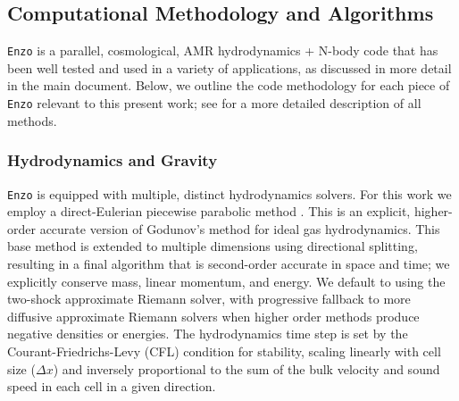 \documentclass[11pt]{article}
\begin{document}
\subsection{Computational Methodology and Algorithms}

\texttt{Enzo} is a parallel, cosmological, AMR hydrodynamics + N-body code that has been well tested and used in a variety of applications, as discussed in more detail in the main document. Below, we outline the code methodology for each piece of \texttt{Enzo} relevant to this present work; see \cite{Enzo2014} for a more detailed description of all methods. 

\subsubsection{Hydrodynamics and Gravity}

\texttt{Enzo} is equipped with multiple, distinct hydrodynamics solvers. For this work we employ a direct-Eulerian piecewise parabolic method \citep{ColellaWoodward1984, Bryan1995}. This is an explicit, higher-order accurate version of Godunov's method for ideal gas hydrodynamics. This base method is extended to multiple dimensions using directional splitting, resulting in a final algorithm that is second-order accurate in space and time; we explicitly conserve mass, linear momentum, and energy. We default to using the two-shock approximate Riemann solver, with progressive fallback to more diffusive approximate Riemann solvers when higher order methods produce negative densities or energies. The hydrodynamics time step is set by the Courant-Friedrichs-Levy (CFL) condition for stability, scaling linearly with cell size ($\Delta x$) and inversely proportional to the sum of the bulk velocity and sound speed in each cell in a given direction. 
\end{document}
